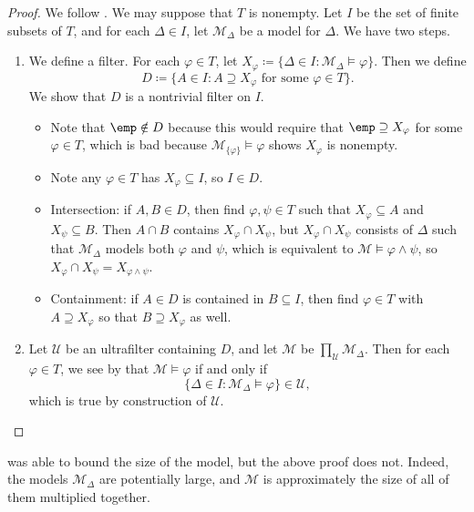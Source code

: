 \documentclass[../notes.tex]{subfiles}
\begin{document}
\begin{proof}
	We follow \cite[Exercise~2.5.20]{marker}. We may suppose that $T$ is nonempty. Let $I$ be the set of finite subsets of $T$, and for each $\Delta\in I$, let $\mathcal M_\Delta$ be a model for $\Delta$. We have two steps.
	\begin{enumerate}
		\item We define a filter. For each $\varphi\in T$, let $X_\varphi\coloneqq\{\Delta\in I:\mathcal M_\Delta\models\varphi\}$. Then we define
		\[D\coloneqq\{A\in I:A\supseteq X_\varphi\text{ for some }\varphi\in T\}.\]
		We show that $D$ is a nontrivial filter on $I$.
		\begin{itemize}
			\item Note that $\emp\notin D$ because this would require that $\emp\supseteq X_\varphi$ for some $\varphi\in T$, which is bad because $\mathcal M_{\{\varphi\}}\models\varphi$ shows $X_\varphi$ is nonempty.
			\item Note any $\varphi\in T$ has $X_\varphi\subseteq I$, so $I\in D$.
			\item Intersection: if $A,B\in D$, then find $\varphi,\psi\in T$ such that $X_\varphi\subseteq A$ and $X_\psi\subseteq B$. Then $A\cap B$ contains $X_{\varphi}\cap X_\psi$, but $X_\varphi\cap X_\psi$ consists of $\Delta$ such that $\mathcal M_\Delta$ models both $\varphi$ and $\psi$, which is equivalent to $\mathcal M\models\varphi\land\psi$, so $X_\varphi\cap X_\psi=X_{\varphi\land\psi}$.
			\item Containment: if $A\in D$ is contained in $B\subseteq I$, then find $\varphi\in T$ with $A\supseteq X_\varphi$ so that $B\supseteq X_\varphi$ as well.
		\end{itemize}
		\item Let $\mathcal U$ be an ultrafilter containing $D$, and let $\mathcal M$ be $\prod_\mathcal U\mathcal M_\Delta$. Then for each $\varphi\in T$, we see by  that $\mathcal M\models\varphi$ if and only if
		\[\{\Delta\in I:\mathcal M_\Delta\models\varphi\}\in\mathcal U,\]
		which is true by construction of $\mathcal U$.
		\qedhere
	\end{enumerate}
\end{proof}
\begin{remark}
	 was able to bound the size of the model, but the above proof does not. Indeed, the models $\mathcal M_\Delta$ are potentially large, and $\mathcal M$ is approximately the size of all of them multiplied together.
\end{remark}
\end{document}
